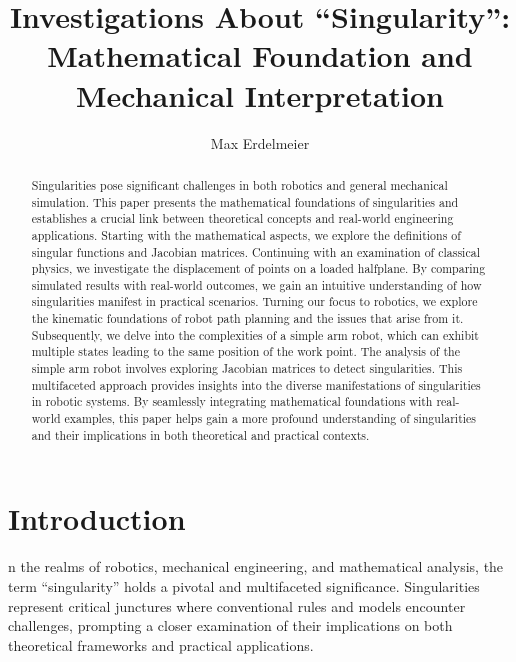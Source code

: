 \documentclass[journal]{IEEEtran}
\begin{document}
\title{Investigations About “Singularity”:\\ Mathematical Foundation and Mechanical Interpretation}
\author{Max Erdelmeier}

\maketitle


\begin{abstract}
Singularities pose significant challenges in both robotics and general mechanical simulation.
This paper presents the mathematical foundations of singularities and
establishes a crucial link between theoretical concepts and real-world engineering applications.
Starting with the mathematical aspects, we explore the definitions of singular functions and Jacobian matrices.
Continuing with an examination of classical physics, we investigate the displacement of points on a loaded halfplane.
By comparing simulated results with real-world outcomes,
we gain an intuitive understanding of how singularities manifest in practical scenarios.
Turning our focus to robotics, we explore the kinematic foundations of robot path planning and the issues that arise from it.
Subsequently, we delve into the complexities of a simple arm robot,
which can exhibit multiple states leading to the same position of the work point.
The analysis of the simple arm robot involves exploring Jacobian matrices to detect singularities.
This multifaceted approach provides insights into the diverse manifestations of singularities in robotic systems.
By seamlessly integrating mathematical foundations with real-world examples,
this paper helps gain a more profound understanding of singularities and their implications in both theoretical and practical contexts.
\end{abstract}


\section{Introduction}
n the realms of robotics, mechanical engineering, and mathematical analysis, the term ``singularity'' holds a pivotal and multifaceted significance.
Singularities represent critical junctures where conventional rules and models encounter challenges,
prompting a closer examination of their implications on both theoretical frameworks and practical applications.
\end{document}
